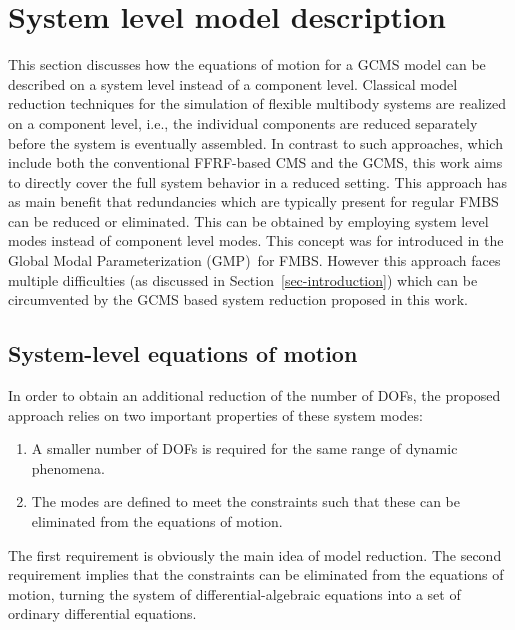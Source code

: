 \section{{System level model description}}
\label{sec-GMP_overview}

This section discusses how the equations of motion for a GCMS model can be described on a system level instead of a component level. 
Classical model reduction techniques for the simulation of flexible multibody systems are realized on a component level, i.e., the individual components are reduced separately before the system is eventually assembled.
In contrast to such approaches, which include both the conventional FFRF-based CMS and the GCMS, this work aims to directly cover the full system behavior in a reduced setting. This approach has as main benefit that redundancies which are typically present for regular FMBS can be reduced or eliminated. This can be obtained by employing system level modes instead of component level modes.
This concept was for introduced in the Global Modal Parameterization (GMP)~\cite{Bruls_IJNME2008, NaetsHeirman2011, Naets_MUBO2011}for FMBS. However this approach faces multiple difficulties (as discussed in Section~\ref{sec-introduction}) which can be circumvented by the GCMS based system reduction proposed in this work. 

\subsection{System-level equations of motion} 
In order to obtain an additional reduction of the number of DOFs, the proposed approach relies on two important properties of these system modes:
\begin{enumerate}
\item A smaller number of DOFs is required for the same range of dynamic phenomena. 
\item The modes are defined to meet the constraints such that these can be eliminated from the equations of motion. 
\end{enumerate}
The first requirement is obviously the main idea of model reduction. The second requirement implies that the constraints can be eliminated from the equations of motion, turning the system of differential-algebraic equations into a set of ordinary differential equations.

